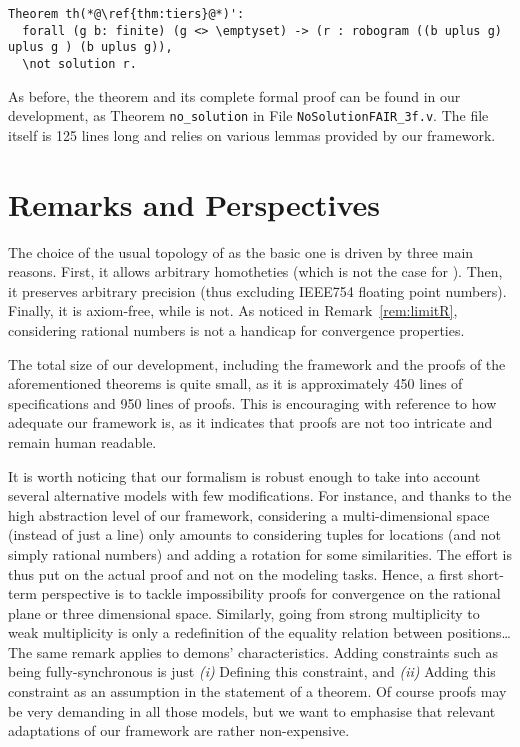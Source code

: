 \documentclass[11pt,a4]{llncs}
\begin{document}
\begin{lstlisting}
Theorem th(*@\ref{thm:tiers}@*)': 
  forall (g b: finite) (g <> \emptyset) -> (r : robogram ((b uplus g) uplus g ) (b uplus g)), 
  \not solution r.
\end{lstlisting}


As before, the theorem and its complete formal proof can be found in our
development, as Theorem \lstinline!no_solution! in File
\lstinline!NoSolutionFAIR_3f.v!. The file itself is 125 lines long
and relies on various lemmas provided by our
framework.

\section{Remarks and Perspectives}
\label{sec:concl}

The choice of the usual topology of  as the basic one is driven
by three main reasons. First, it allows arbitrary homotheties (which is not
the case for ). Then, it preserves arbitrary precision
(thus excluding \textsc{IEEE754} floating point numbers). Finally, it
is axiom-free, while  is not. As noticed in
Remark~\ref{rem:limitR}, considering rational numbers is not a handicap
for convergence properties.

The total size of our development, including the framework and the
proofs of the aforementioned theorems is quite small, as it is
approximately 450 lines of specifications and 950 lines of proofs. This
is encouraging with reference to how adequate our framework is, as it
indicates that proofs are not too intricate and remain human readable.

It is worth noticing that our formalism is robust enough to take into
account several alternative models with few modifications.  For instance, and
thanks to the high abstraction level of our framework, considering a
multi-dimensional space (instead of just a line) only amounts to
considering tuples for locations (and not simply rational numbers) and
adding a rotation for some similarities. The effort is
thus put on the actual proof and not on the modeling tasks. Hence, a
first short-term perspective is to tackle impossibility proofs for convergence on
the rational plane or three dimensional space. Similarly, going from strong multiplicity to weak
multiplicity is only a redefinition of the equality relation between
positions\ldots The same remark applies to demons'
characteristics. Adding constraints such as being fully-synchronous is
just \emph{(i)} Defining this constraint, and \emph{(ii)} Adding this constraint as an
assumption in the statement of a theorem. Of course proofs may be very
demanding in all those models, but we want to emphasise that relevant
adaptations of our framework are rather non-expensive.
\end{document}
